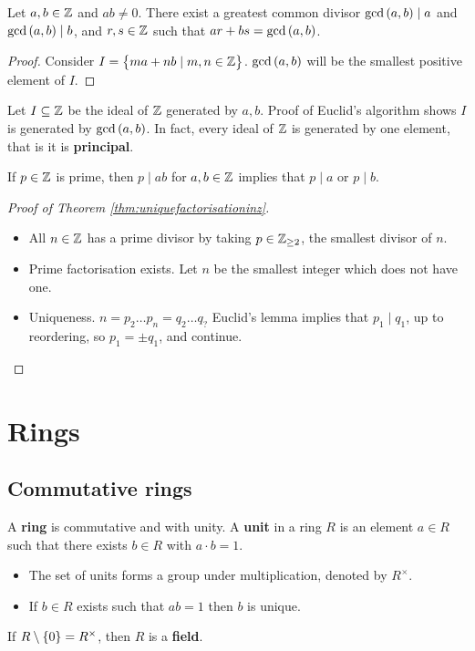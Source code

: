\begin{proposition}
Let $ a, b \in \mathbb{Z} $ and $ ab \ne 0 $. There exist a greatest common divisor $ \gcd\br{a, b} \mid a $ and $ \gcd\br{a, b} \mid b $, and $ r, s \in \mathbb{Z} $ such that $ ar + bs = \gcd\br{a, b} $.
\end{proposition}

\begin{proof}
Consider $ I = \cbr{ma + nb \mid m, n \in \Z} $. $ \gcd\br{a, b} $ will be the smallest positive element of $ I $.
\end{proof}

Let $ I \subseteq \mathbb{Z} $ be the ideal of $ \mathbb{Z} $ generated by $ a, b $. Proof of Euclid's algorithm shows $ I $ is generated by $ \gcd\br{a, b} $. In fact, every ideal of $ \mathbb{Z} $ is generated by one element, that is it is \textbf{principal}.

\begin{proposition}
If $ p \in \mathbb{Z} $ is prime, then $ p \mid ab $ for $ a, b \in \mathbb{Z} $ implies that $ p \mid a $ or $ p \mid b $.
\end{proposition}

\begin{proof}[Proof of Theorem \ref{thm:uniquefactorisationinz}]
\hfill
\begin{itemize}
\item All $ n \in \mathbb{Z} $ has a prime divisor by taking $ p \in \mathbb{Z}_{\ge 2} $, the smallest divisor of $ n $.
\item Prime factorisation exists. Let $ n $ be the smallest integer which does not have one.
\item Uniqueness. $ n = p_2 \dots p_n = q_2 \dots q_? $ Euclid's lemma implies that $ p_1 \mid q_1 $, up to reordering, so $ p_1 = \pm q_1 $, and continue.
\end{itemize}
\end{proof}

\pagebreak

\section{Rings}


\subsection{Commutative rings}

\begin{definition}
A \textbf{ring} is commutative and with unity. A \textbf{unit} in a ring $ R $ is an element $ a \in R $ such that there exists $ b \in R $ with $ a \cdot b = 1 $.
\begin{itemize}
\item The set of units forms a group under multiplication, denoted by $ R^\times $.
\item If $ b \in R $ exists such that $ ab = 1 $ then $ b $ is unique.
\end{itemize}
If $ R \setminus \cbr{0} = R^\times $, then $ R $ is a \textbf{field}.
\end{definition}

